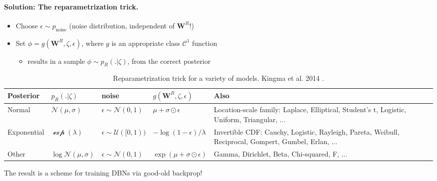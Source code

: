 \documentclass{article} %
\def\W{\mathbf{W}}
\begin{document}
\paragraph{Solution: The reparametrization trick.}
\begin{itemize}
\item Choose $\epsilon \sim p_{\text{noise}}$ (noise distribution, independent of $\W^R$!)
\item Set $\phi = g(\W^{R}, \zeta, \epsilon)$, where $g$ is an appropriate class $\mathcal C^1$ function
  \begin{itemize}
  \item results in a sample $\phi \sim p_R(.|\zeta)$, from the correct
    posterior
    \end{itemize}
\end{itemize}

\begin{table}[H]
  \begin{tabular}{p{1.7cm}|p{1.5cm}|p{1.9cm}|p{2.1cm}|p{5cm}}
         \hline
         Posterior & $p_R(.|\zeta)$ & noise & $g(\W^R,\zeta,\epsilon)$ & Also \\ \hline
         Normal & $\mathcal N(\mu,\sigma)$ & $\epsilon \sim \mathcal N(0, 1)$ & $\mu + \sigma \odot \epsilon$ & Location-scale family: Laplace, Elliptical,
         Student’s t, Logistic, Uniform, Triangular, ... \\ \hline
         Exponential & $\mathcal \exp(\lambda)$ & $\epsilon \sim \mathcal U([0, 1))$ & $-\log(1-\epsilon)/\lambda$ & Invertible CDF: Cauchy, Logistic, Rayleigh, Pareta, Weibull, Reciprocal, Gompert, Gumbel, Erlan, ... \\ \hline
         Other & $\log\mathcal N(\mu,\sigma)$ & $\epsilon \sim \mathcal N(0, 1)$ & $\exp(\mu + \sigma \odot \epsilon)$ & Gamma, Dirichlet, Beta, Chi-squared, F, ... \\ \hline
  \end{tabular}
  \caption{Reparametrization trick for a variety of models. Kingma et al. 2014 \citep{kingma2013auto}.}
\end{table}

The result is a scheme for training DBNs via good-old backprop!

\end{document}
